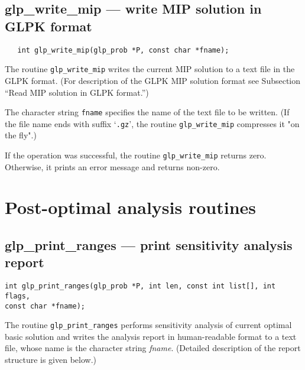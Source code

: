 \subsection{glp\_write\_mip --- write MIP solution in GLPK format}

\synopsis

\begin{verbatim}
   int glp_write_mip(glp_prob *P, const char *fname);
\end{verbatim}

\description

The routine \verb|glp_write_mip| writes the current MIP solution to
a text file in the GLPK format. (For description of the GLPK MIP
solution format see Subsection ``Read MIP solution in GLPK format.'')

The character string \verb|fname| specifies the name of the text file
to be written. (If the file name ends with suffix `\verb|.gz|', the
routine \verb|glp_write_mip| compresses it "on the fly".)

\returns

If the operation was successful, the routine \verb|glp_write_mip|
returns zero. Otherwise, it prints an error message and returns
non-zero.


\newpage

\section{Post-optimal analysis routines}

\subsection{glp\_print\_ranges --- print sensitivity analysis report}

\synopsis

{\tt int glp\_print\_ranges(glp\_prob *P, int len, const int list[],
int flags,\\
\hspace*{134pt}const char *fname);}

\description

The routine \verb|glp_print_ranges| performs sensitivity analysis of
current optimal basic solution and writes the analysis report in
human-readable format to a text file, whose name is the character
string {\it fname}. (Detailed description of the report structure is
given below.)

